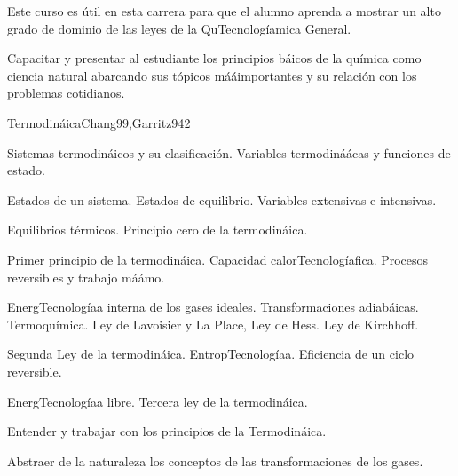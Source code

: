 \begin{syllabus}


\begin{justification}
Este curso es útil en esta carrera para que el alumno aprenda a mostrar un alto grado de dominio de las leyes de la QuTecnologíamica General.
\end{justification}

\begin{goals}
\item Capacitar y presentar al estudiante los principios báicos de la química como ciencia natural abarcando sus tópicos mááimportantes y su relación con los problemas cotidianos.
\end{goals}

\begin{outcomes}
\end{outcomes}

\begin{unit}{Termodináica}{Chang99,Garritz94}{2}
\begin{topics}
	\item Sistemas termodináicos y su clasificación. Variables termodináácas y funciones de estado.
	\item Estados de un sistema. Estados de equilibrio. Variables extensivas e intensivas.
	\item Equilibrios térmicos. Principio cero de la termodináica.
	\item Primer principio de la termodináica. Capacidad calorTecnologíafica. Procesos reversibles y trabajo máámo.
	\item EnergTecnologíaa interna de los gases ideales. Transformaciones adiabáicas. Termoquímica. Ley de Lavoisier y La Place, Ley de Hess. Ley de Kirchhoff.
	\item Segunda Ley de la termodináica. EntropTecnologíaa. Eficiencia de un ciclo reversible.
	\item EnergTecnologíaa libre. Tercera ley de la termodináica.
\end{topics}

\begin{unitgoals}
	\item Entender y trabajar con los principios de la Termodináica.
	\item Abstraer de la naturaleza los conceptos de las transformaciones de los gases.
\end{unitgoals}
\end{unit}


\end{syllabus}
